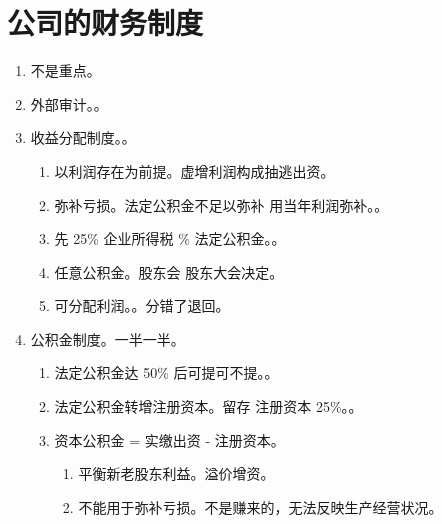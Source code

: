 \section{公司的财务制度}
\begin{enumerate}
  \item 不是重点。
  \item 外部审计。。
  \item 收益分配制度。。
        \begin{enumerate}
          \item 以利润存在为前提。虚增利润构成抽逃出资。
          \item 弥补亏损。法定公积金不足以弥补 \yjt 用当年利润弥补。。
          \item 先 25\% 企业所得税 \% 法定公积金。。
          \item 任意公积金。股东会 \hz 股东大会决定。
          \item 可分配利润。。分错了退回。
        \end{enumerate}
  \item 公积金制度。一半一半。
        \begin{enumerate}
          \item 法定公积金达 50\% 后可提可不提。。
          \item 法定公积金转增注册资本。留存 \dydy 注册资本 25\%。。
          \item 资本公积金 = 实缴出资 - 注册资本。
                \begin{enumerate}
                  \item 平衡新老股东利益。溢价增资。
                  \item 不能用于弥补亏损。不是赚来的，无法反映生产经营状况。
                \end{enumerate}
        \end{enumerate}
\end{enumerate}
